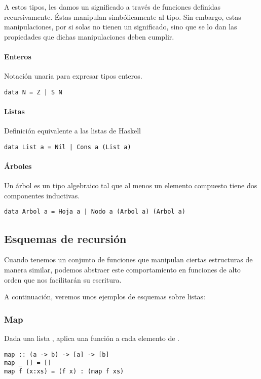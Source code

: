 A estos tipos, les damos un significado a través de funciones definidas recursivamente. Éstas manipulan simbólicamente al tipo. Sin embargo, estas manipulaciones, por si solas no tienen un significado, sino que se lo dan las propiedades que dichas manipulaciones deben cumplir.

\paragraph{Enteros} Notación unaria para expresar tipos enteros.
\begin{centrado}
	\begin{verbatim}
data N = Z | S N
	\end{verbatim}
\end{centrado}

\paragraph{Listas} Definición equivalente a las listas de Haskell
\begin{centrado}
	\begin{verbatim}
data List a = Nil | Cons a (List a)
	\end{verbatim}
\end{centrado}

\paragraph{Árboles}
Un árbol es un tipo algebraico tal que al menos un elemento compuesto tiene dos componentes inductivas.

\begin{centrado}
	\begin{verbatim}
data Arbol a = Hoja a | Nodo a (Arbol a) (Arbol a)
	\end{verbatim}
\end{centrado}

\subsection{Esquemas de recursión} \label{sec:funcional.sub:esquemas_recursion}
Cuando tenemos un conjunto de funciones que manipulan ciertas estructuras de manera similar, podemos abstraer este comportamiento en funciones de alto orden que nos facilitarán su escritura.

A continuación, veremos unos ejemplos de esquemas sobre listas: 
\subsubsection{Map}
Dada una lista , aplica una función  a cada elemento de .
\begin{centrado}
	\begin{verbatim}
map :: (a -> b) -> [a] -> [b]
map _ [] = []
map f (x:xs) = (f x) : (map f xs)
	\end{verbatim}
\end{centrado} 

